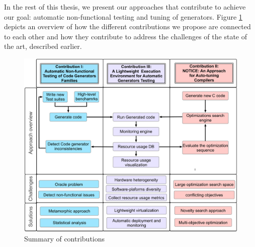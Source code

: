 
In the rest of this thesis, we present our approaches that contribute to achieve our goal: automatic non-functional testing and tuning of generators. Figure \ref{fig:overview} depicts an overview of how the different contributions we propose are connected to each other and how they contribute to address the challenges of the state of the art, described earlier.

\begin{figure}[h]
	\center
	\includegraphics[scale=0.23]{Chapitre0/fig/overview}
	\caption{Summary of contributions}
	\label{fig:overview}
\end{figure}

